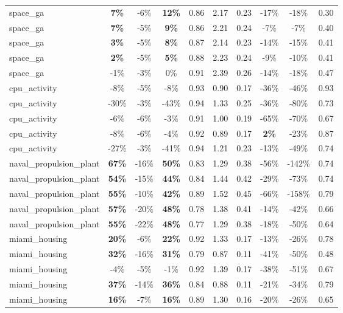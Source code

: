 \begin{table}[!htbp]
\begin{small}
\begin{sc}
{\begin{tabular}{lccccccccc}
space\_ga & \textbf{7\%} & -6\% & \textbf{12\%} & 0.86 & 2.17 & 0.23 & -17\% & -18\% & 0.30 \\
space\_ga & \textbf{7\%} & -5\% & \textbf{9\%} & 0.86 & 2.21 & 0.24 & -7\% & -7\% & 0.40 \\
space\_ga & \textbf{3\%} & -5\% & \textbf{8\%} & 0.87 & 2.14 & 0.23 & -14\% & -15\% & 0.41 \\
space\_ga & \textbf{2\%} & -5\% & \textbf{5\%} & 0.88 & 2.23 & 0.24 & -9\% & -10\% & 0.41 \\
space\_ga & -1\% & -3\% & 0\% & 0.91 & 2.39 & 0.26 & -14\% & -18\% & 0.47 \\
cpu\_activity & -8\% & -5\% & -8\% & 0.93 & 0.90 & 0.17 & -36\% & -46\% & 0.93 \\
cpu\_activity & -30\% & -3\% & -43\% & 0.94 & 1.33 & 0.25 & -36\% & -80\% & 0.73 \\
cpu\_activity & -6\% & -6\% & -3\% & 0.91 & 1.00 & 0.19 & -65\% & -70\% & 0.67 \\
cpu\_activity & -8\% & -6\% & -4\% & 0.92 & 0.89 & 0.17 & \textbf{2\%} & -23\% & 0.87 \\
cpu\_activity & -27\% & -3\% & -41\% & 0.94 & 1.21 & 0.23 & -13\% & -49\% & 0.74 \\
naval\_propulsion\_plant & \textbf{67\%} & -16\% & \textbf{50\%} & 0.83 & 1.29 & 0.38 & -56\% & -142\% & 0.74 \\
naval\_propulsion\_plant & \textbf{54\%} & -15\% & \textbf{44\%} & 0.84 & 1.44 & 0.42 & -29\% & -73\% & 0.74 \\
naval\_propulsion\_plant & \textbf{55\%} & -10\% & \textbf{42\%} & 0.89 & 1.52 & 0.45 & -66\% & -158\% & 0.79 \\
naval\_propulsion\_plant & \textbf{57\%} & -20\% & \textbf{48\%} & 0.78 & 1.38 & 0.41 & -14\% & -42\% & 0.66 \\
naval\_propulsion\_plant & \textbf{55\%} & -22\% & \textbf{48\%} & 0.77 & 1.29 & 0.38 & -18\% & -50\% & 0.64 \\
miami\_housing & \textbf{20\%} & -6\% & \textbf{22\%} & 0.92 & 1.33 & 0.17 & -13\% & -26\% & 0.78 \\
miami\_housing & \textbf{32\%} & -16\% & \textbf{31\%} & 0.79 & 0.87 & 0.11 & -41\% & -50\% & 0.48 \\
miami\_housing & -4\% & -5\% & -1\% & 0.92 & 1.39 & 0.17 & -38\% & -51\% & 0.67 \\
miami\_housing & \textbf{37\%} & -14\% & \textbf{36\%} & 0.84 & 0.88 & 0.11 & -21\% & -34\% & 0.79 \\
miami\_housing & \textbf{16\%} & -7\% & \textbf{16\%} & 0.89 & 1.30 & 0.16 & -20\% & -26\% & 0.65 \\

\end{tabular}}
\end{sc}
\end{small}
\end{table}
